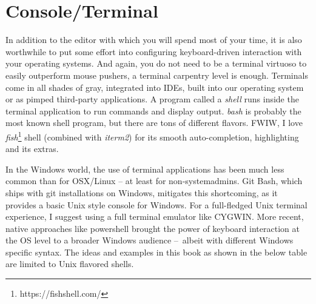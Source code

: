 \documentclass[
  12pt,
  letterpaper,
]{krantz}
\begin{document}
\hypertarget{consoleterminal}{%
\section{Console/Terminal}\label{consoleterminal}}

In addition to the editor with which you will spend most of your time,
it is also worthwhile to put some effort into configuring
keyboard-driven interaction with your operating systems. And again, you
do not need to be a terminal virtuoso to easily outperform mouse
pushers, a terminal carpentry level is enough. Terminals come in all
shades of gray, integrated into IDEs, built into our operating system or
as pimped third-party applications. A program called a \emph{shell} runs
inside the terminal application to run commands and display output.
\emph{bash} is probably the most known shell program, but there are tons
of different flavors. FWIW, I love \emph{fish}\footnote{https://fishshell.com/}
shell (combined with \emph{iterm2}) for its smooth auto-completion,
highlighting and its extras.

In the Windows world, the use of terminal applications has been much
less common than for OSX/Linux -- at least for non-systemadmins. Git
Bash, which ships with git  installations on
Windows, mitigates this shortcoming, as it provides a basic Unix style
console for Windows. For a full-fledged Unix terminal experience, I
suggest using a full terminal emulator like CYGWIN. More recent, native
approaches like powershell brought the power of keyboard interaction at
the OS level to a broader Windows audience --~albeit with different
Windows specific syntax. The ideas and examples in this book as shown in
the below table are limited to Unix flavored shells.
\end{document}
